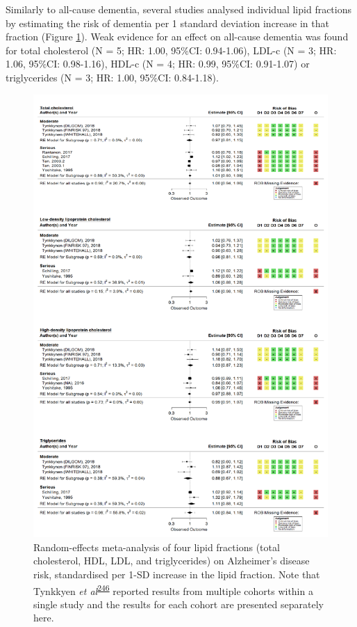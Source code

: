 \documentclass[a4paper, twoside]{templates/ociamthesis}
\begin{document}
Similarly to all-cause dementia, several studies analysed individual lipid fractions by estimating the risk of dementia per 1 standard deviation increase in that fraction (Figure \ref{fig:lipidFractionsAD}). Weak evidence for an effect on all-cause dementia was found for total cholesterol (N = 5; HR: 1.00, 95\%CI: 0.94-1.06), LDL-c (N = 3; HR: 1.06, 95\%CI: 0.98-1.16), HDL-c (N = 4; HR: 0.99, 95\%CI: 0.91-1.07) or triglycerides (N = 3; HR: 1.00, 95\%CI: 0.84-1.18).





\begin{figure}[H]
\includegraphics[width=1\linewidth]{figures/sys-rev/fp_lipids_composite_AD} \caption[Random-effects meta-analysis of four lipid fractions on Alzheimer's disease]{Random-effects meta-analysis of four lipid fractions (total cholesterol, HDL, LDL, and triglycerides) on Alzheimer's disease risk, standardised per 1-SD increase in the lipid fraction. Note that Tynkkyen \emph{et al}\textsuperscript{\protect\hyperlink{ref-tynkkynen2018}{246}} reported results from multiple cohorts within a single study and the results for each cohort are presented separately here.}\label{fig:lipidFractionsAD}
\end{figure}
\end{document}
